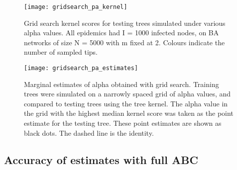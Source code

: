 \begin{figure}[ht]
  \centering
  \texttt{[image: gridsearch\_pa\_kernel]}
  \caption[Grid search kernel scores]{
    Grid search kernel scores for testing trees simulated under various
    \gls{alpha} values. All epidemics had \gls{I} = 1000 infected nodes, on
    \gls{BA} networks of size \gls{N} = 5000 with \gls{m} fixed at 2. Colours
    indicate the number of sampled tips.
  }
  \label{fig:gridkernel}
\end{figure}

\begin{figure}[ht]
  \centering
  \texttt{[image: gridsearch\_pa\_estimates]}
  \caption[Marginal estimates of \gls{alpha} obtained with grid search]{
    Marginal estimates of \gls{alpha} obtained with grid search. Training trees
    were simulated on a narrowly spaced grid of \gls{alpha} values, and
    compared to testing trees using the tree kernel. The \gls{alpha} value in
    the grid with the highest median kernel score was taken as the point
    estimate for the testing tree. These point estimates are shown as black
    dots. The dashed line is the identity.
  }
  \label{fig:gridest}
\end{figure}

\subsection{Accuracy of estimates with full ABC}

